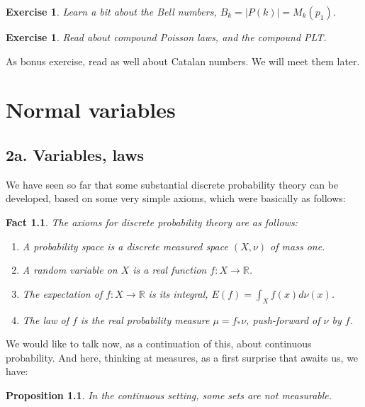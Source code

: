 \documentclass[12pt]{amsbook}
\newtheorem{exercise}[theorem]{Exercise}
\newtheorem{fact}[theorem]{Fact}
\newtheorem{proposition}[theorem]{Proposition}
\begin{document}
\begin{exercise}
Learn a bit about the Bell numbers, $B_k=|P(k)|=M_k(p_1)$.
\end{exercise}

\begin{exercise}
Read about compound Poisson laws, and the compound PLT.
\end{exercise}

As bonus exercise, read as well about Catalan numbers. We will meet them later.

\chapter{Normal variables}

\section*{2a. Variables, laws}

We have seen so far that some substantial discrete probability theory can be developed, based on some very simple axioms, which were basically as follows:

\begin{fact}
The axioms for discrete probability theory are as follows:
\begin{enumerate}
\item A probability space is a discrete measured space $(X,\nu)$ of mass one.

\item A random variable on $X$ is a real function $f:X\to\mathbb R$.

\item The expectation of $f:X\to\mathbb R$ is its integral, $E(f)=\int_Xf(x)d\nu(x)$.

\item The law of $f$ is the real probability measure $\mu=f_*\nu$, push-forward of $\nu$ by $f$.
\end{enumerate}
\end{fact}

We would like to talk now, as a continuation of this, about continuous probability. And here, thinking at measures, as a first surprise that awaits us, we have:

\begin{proposition}
In the continuous setting, some sets are not measurable.
\end{proposition}
\end{document}
